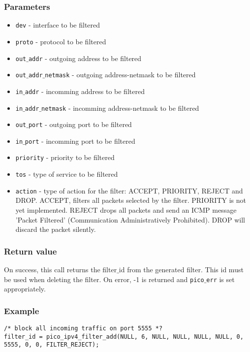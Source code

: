\subsubsection*{Parameters}
\begin{itemize}[noitemsep]
\item \texttt{dev} - interface to be filtered
\item \texttt{proto} - protocol to be filtered
\item \texttt{out$\_$addr} - outgoing address to be filtered
\item \texttt{out$\_$addr$\_$netmask} - outgoing address-netmask to be filtered
\item \texttt{in$\_$addr} - incomming address to be filtered
\item \texttt{in$\_$addr$\_$netmask} - incomming address-netmask to be filtered
\item \texttt{out$\_$port} - outgoing port to be filtered
\item \texttt{in$\_$port} - incomming port to be filtered
\item \texttt{priority} - priority to be filtered
\item \texttt{tos} - type of service to be filtered
\item \texttt{action} - type of action for the filter: ACCEPT, PRIORITY, REJECT and DROP. ACCEPT, filters all packets selected by the filter. PRIORITY is not yet implemented. REJECT drops all packets and send an ICMP message 'Packet Filtered' (Communication Administratively Prohibited). DROP will discard the packet silently.
\end{itemize}

\subsubsection*{Return value}
On success, this call returns the filter$\_$id from the generated filter. This id must be used when deleting the filter.
On error, -1 is returned and \texttt{pico$\_$err} is set appropriately.

\subsubsection*{Example}
\begin{verbatim}
/* block all incoming traffic on port 5555 *?
filter_id = pico_ipv4_filter_add(NULL, 6, NULL, NULL, NULL, NULL, 0, 5555, 0, 0, FILTER_REJECT);
\end{verbatim}

